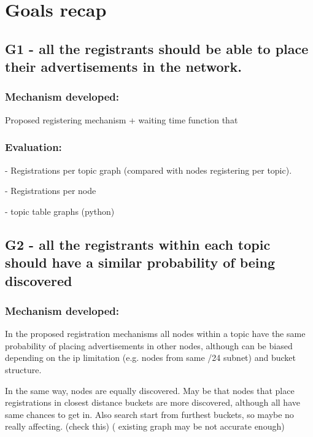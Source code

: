 \section{Goals recap}


\subsection{G1 - all the registrants  should be able to place their advertisements in the network.}

\subsubsection{Mechanism developed:} 

Proposed registering mechanism + waiting time function that 

\subsubsection{Evaluation: }


- Registrations per topic graph (compared with nodes registering per topic).  

- Registrations per node

- topic table graphs (python)

\subsection{G2 -  all the registrants within each topic should have a similar probability of being discovered}

\subsubsection{Mechanism developed:} 

In the proposed registration mechanisms all nodes within a topic have the same probability of placing advertisements in other nodes,  although can be biased depending on the ip limitation (e.g. nodes from same /24 subnet) and bucket structure.

In the same way,  nodes are equally discovered. 
May be that nodes that place registrations in closest distance buckets are more discovered, although all have same chances to get in. 
Also search start from furthest buckets,  so maybe no really affecting. 
 (check this)
 ( existing graph may be not accurate enough)

